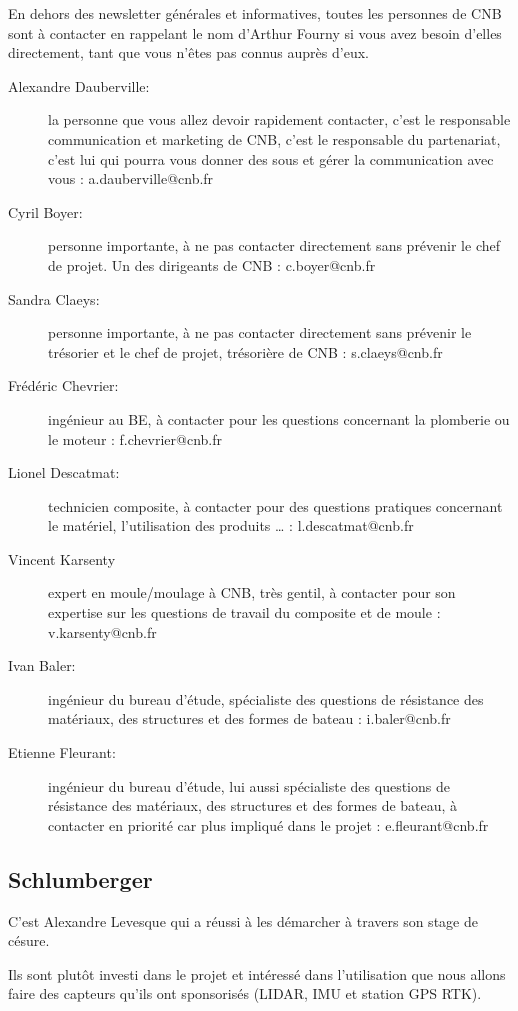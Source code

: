\documentclass[a4paper, 11pt]{report}
\begin{document}
En dehors des newsletter générales et informatives, toutes les personnes de CNB sont à contacter en rappelant le nom d’Arthur Fourny si vous avez besoin d’elles directement, tant que vous n’êtes pas connus auprès d’eux.
\begin{description}
\item[Alexandre Dauberville:]la personne que vous allez devoir rapidement contacter, c’est le responsable communication et marketing de CNB, c’est le responsable du partenariat, c’est lui qui pourra vous donner des sous et gérer la communication avec vous : a.dauberville@cnb.fr
\item[Cyril Boyer:] personne importante, à ne pas contacter directement sans prévenir le chef de projet. Un des dirigeants de CNB : c.boyer@cnb.fr
\item[Sandra Claeys:]personne importante, à ne pas contacter directement sans prévenir le trésorier et le chef de projet, trésorière de CNB : s.claeys@cnb.fr
\item[Frédéric Chevrier:]ingénieur au BE, à contacter pour les questions concernant la plomberie ou le moteur : f.chevrier@cnb.fr
\item[Lionel Descatmat:]technicien composite, à contacter pour des questions pratiques concernant le matériel, l’utilisation des produits … : l.descatmat@cnb.fr
\item[Vincent Karsenty]expert en moule/moulage à CNB, très gentil, à contacter pour son expertise sur les questions de travail du composite et de moule : v.karsenty@cnb.fr
\item[Ivan Baler:]ingénieur du bureau d’étude, spécialiste des questions de résistance des matériaux, des structures et des formes de bateau : i.baler@cnb.fr
\item[Etienne Fleurant:]ingénieur du bureau d’étude, lui aussi spécialiste des questions de résistance des matériaux, des structures et des formes de bateau, à contacter en priorité car plus impliqué dans le projet : e.fleurant@cnb.fr
\end{description}

\subsection{Schlumberger}
C'est Alexandre Levesque qui a réussi à les démarcher à travers son stage de césure. 

Ils sont plutôt investi dans le projet et intéressé dans l'utilisation que nous allons faire des capteurs qu'ils ont sponsorisés (LIDAR, IMU et station GPS RTK).
\end{document}
